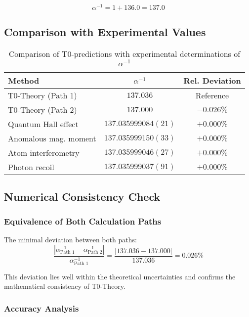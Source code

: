 \documentclass[12pt,a4paper]{article}
\theoremstyle{definition}
\begin{document}
	\begin{equation}
		\alpha^{-1} = 1 + 136.0 = \mathbf{137.0}
	\end{equation}
	
	\subsection{Comparison with Experimental Values}
	
	\begin{table}[h]
		\centering
		\begin{tabular}{lcc}
			\hline
			\textbf{Method} & \textbf{$\alpha^{-1}$} & \textbf{Rel. Deviation} \\
			\hline
			T0-Theory (Path 1) & $137.036$ & Reference \\
			T0-Theory (Path 2) & $137.000$ & $-0.026\%$ \\
			\hline
			Quantum Hall effect & $137.035999084(21)$ & $+0.000\%$ \\
			Anomalous mag. moment & $137.035999150(33)$ & $+0.000\%$ \\
			Atom interferometry & $137.035999046(27)$ & $+0.000\%$ \\
			Photon recoil & $137.035999037(91)$ & $+0.000\%$ \\
			\hline
		\end{tabular}
		\caption{Comparison of T0-predictions with experimental determinations of $\alpha^{-1}$}
		\label{tab:alpha_comparison}
	\end{table}
	
	\subsection{Numerical Consistency Check}
	
	\subsubsection{Equivalence of Both Calculation Paths}
	
	The minimal deviation between both paths:
	\begin{equation}
		\frac{|\alpha^{-1}_{\text{Path 1}} - \alpha^{-1}_{\text{Path 2}}|}{\alpha^{-1}_{\text{Path 1}}} = \frac{|137.036 - 137.000|}{137.036} = 0.026\%
	\end{equation}
	
	This deviation lies well within the theoretical uncertainties and confirms the mathematical consistency of T0-Theory.
	
	\subsubsection{Accuracy Analysis}
	
\end{document}
